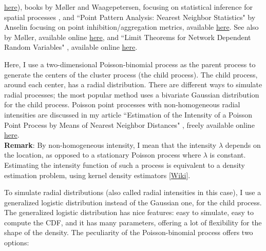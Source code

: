 \documentclass[10pt]{article}
\begin{document}
\href{https://drive.google.com/file/d/1l5VI7gvS2TKUC11VrkOpph4ITZ8GIO81/view?usp=sharing}{here}),  books by Møller and Waagepetersen, focusing on statistical inference for spatial processes \cite{momo66,momo67}, and ``Point Pattern Analysis: Nearest Neighbor Statistics" by Anselin \cite{anselin} focusing on point inhibition/aggregation metrics, available 
\href{https://spatial.uchicago.edu/sites/spatial.uchicago.edu/files/9_points_2_r.pdf}{here}. See
also \cite{momo55} by Møller, available online \href{https://cimpatogo2018.sciencesconf.org/data/pages/Handout_Moller_CIMPA_Togo_2018.pdf}{here}, and ``Limit Theorems for Network Dependent Random Variables" \cite{econo6}, available online \href{https://arxiv.org/abs/1903.01059}{here}.
 

Here, I use a two-dimensional Poisson-binomial process as the parent process to generate the centers of the cluster process (the child process). The child process, around each center, has a 
\textcolor{index}{radial distribution}. There are different ways to simulate \textcolor{index}{radial processes}; the most popular method uses a bivariate Gaussian distribution for the child process. Poisson point processes with \textcolor{index}{non-homogeneous} radial intensities are discussed in my article ``Estimation of the Intensity of a Poisson Point Process by Means of Nearest Neighbor Distances" \cite{vgstat}, freely available online 
\href{https://www.researchgate.net/publication/230268902_Estimation_of_the_intensity_of_a_Poisson_point_process_by_means_of_nearest_neighbor_distances}{here}. \vspace{1ex} \\
{\bf Remark}: By non-homogeneous intensity, I mean that the intensity $\lambda$ depends on the location, as opposed to a stationary Poisson process where $\lambda$ is constant. Estimating the \textcolor{index}{intensity function} of such a process is equivalent to a \textcolor{index}{density estimation} problem,
using kernel density estimators [\href{https://en.wikipedia.org/wiki/Kernel_density_estimation}{Wiki}].

To simulate radial distributions (also called radial intensities in this case), I use a generalized logistic distribution instead of the Gaussian one, for the child process. The generalized logistic distribution has nice features: easy to simulate, easy to compute the CDF, and it has many parameters, offering a lot of flexibility for the shape of the density. The peculiarity of the Poisson-binomial process offers two options:
\end{document}
